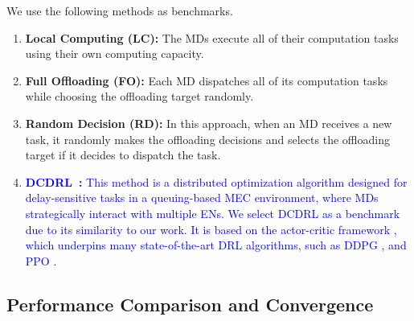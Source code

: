 \documentclass[12pt,draftclsnofoot,onecolumn]{IEEEtran}
\begin{document}
We use the following methods as benchmarks.
\begin{enumerate}
	
	\item \textbf{Local Computing (LC):} The MDs execute all of their computation tasks using their own computing capacity.
	
	\item \textbf{Full Offloading (FO):} Each MD dispatches all of its computation tasks while choosing the offloading target randomly. %
	
	\item \textbf{Random Decision (RD):} In this approach, when an MD receives a new task, it randomly makes the offloading decisions and selects the offloading target if it decides to dispatch the task. %
	
	
	\item \textcolor{blue}{\textbf{DCDRL~\cite{qiu2020distributed}:} This method is a distributed optimization algorithm designed for delay-sensitive tasks in a queuing-based MEC environment, where MDs strategically interact with multiple ENs. We select DCDRL as a benchmark due to its similarity to our work. It is based on the actor-critic framework \cite{NIPS1999_6449f44a}, which underpins many state-of-the-art DRL algorithms, such as DDPG \cite{lillicrap2015continuous}, and PPO \cite{schulman2017proximal}}.
	
	
	
	
	
\end{enumerate}






\subsection{Performance Comparison and Convergence}
\label{section:2}
\end{document}
